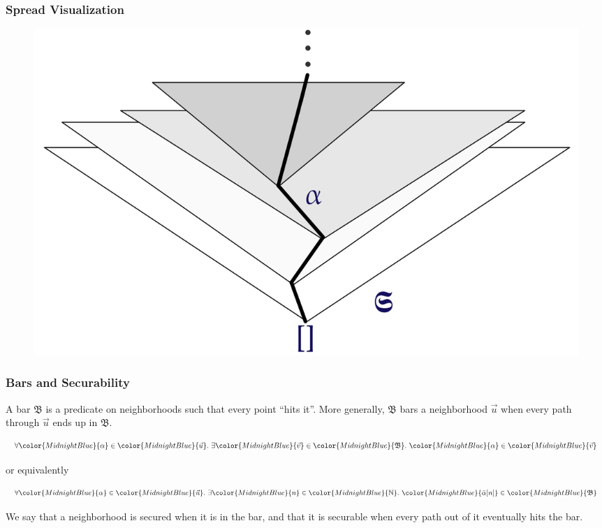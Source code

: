 \documentclass[10pt]{beamer}
\def\InputModeColorName{MidnightBlue}
\newcommand\IMode[1]{{\color{\InputModeColorName}{#1}}}
\newcommand\Member[2]{\IMode{#1}\in \IMode{#2}}
\newcommand\Nat{\mathbb{N}}
\begin{document}
\begin{frame}
  \frametitle{Spread Visualization}
  \begin{figure}
  \includegraphics[width=0.9\linewidth]{illustrations/spread.png}
  \end{figure}
\end{frame}

\begin{frame}
  \frametitle{Bars and Securability}

  A \alert{bar} $\mathfrak{B}$ is a predicate on neighborhoods such that every
  point ``hits it''.  More generally, $\mathfrak{B}$ \alert{bars} a
  neighborhood $\vec{u}$ when every path through $\vec{u}$ ends up in $\mathfrak{B}$.

  \pause
  \[
    \forall \Member{\alpha}{\vec{u}}.\
    \exists \Member{\vec{v}}{\mathfrak{B}}.\
    \Member{\alpha}{\vec{v}}
  \]
  \begin{center}or equivalently\end{center}
  \[
    \forall \Member{\alpha}{\vec{u}}.\
    \exists \Member{n}{\Nat}.\
    \Member{\bar{\alpha}[n]}{\mathfrak{B}}
  \]

  \pause

  We say that a neighborhood is \alert{secured} when it is in the bar, and that
  it is \alert{securable} when every path out of it eventually hits the bar.
\end{frame}
\end{document}

